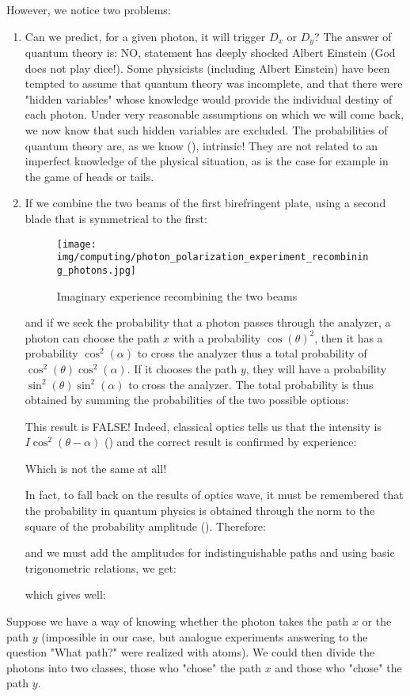 	However, we notice two problems:
	\begin{enumerate}
		\item Can we predict, for a given photon, it will trigger $D_x$ or $D_y$? The answer of quantum theory is: NO, statement has deeply shocked Albert Einstein (God does not play dice!). Some physicists (including Albert Einstein) have been tempted to assume that quantum theory was incomplete, and that there were "hidden variables" whose knowledge would provide the individual destiny of each photon. Under very reasonable assumptions on which we will come back, we now know that such hidden variables are excluded. The probabilities of quantum theory are, as we know (), intrinsic! They are not related to an imperfect knowledge of the physical situation, as is the case for example in the game of heads or tails.

		\item If we combine the two beams of the first birefringent plate, using a second blade that is symmetrical to the first:
		\begin{figure}[H]
			\centering
			\texttt{[image: img/computing/photon\_polarization\_experiment\_recombining\_photons.jpg]}
			\caption[]{Imaginary experience recombining the two beams}
		\end{figure}
		and if we seek the probability that a photon passes through the analyzer, a photon can choose the path $x$ with a probability $\cos(\theta)^2$, then it has a probability $\cos^2(\alpha)$ to cross the analyzer thus a total probability of $\cos^2(\theta)\cos^2(\alpha)$. If it chooses the path $y$, they will have a probability $\sin^2(\theta)\sin^2(\alpha)$ to cross the analyzer. The total probability is thus obtained by summing the probabilities of the two possible options:
		
		This result is FALSE! Indeed, classical optics tells us that the intensity is $I\cos^2(\theta-\alpha)$ () and the correct result is confirmed by experience:
		
		Which is not the same at all!
		
		In fact, to fall back on the results of optics wave, it must be remembered that the probability in quantum physics is obtained through the norm to the square of the probability amplitude (). Therefore:
		
		and we must add the amplitudes for indistinguishable paths and using basic trigonometric relations, we get:
		
		which gives well:
		
	\end{enumerate}
	Suppose we have a way of knowing whether the photon takes the path $x$ or the path $y$ (impossible in our case, but analogue experiments answering to the question "What path?" were realized with atoms). We could then divide the photons into two classes, those who "chose" the path $x$ and those who "chose" the path $y$.
	
